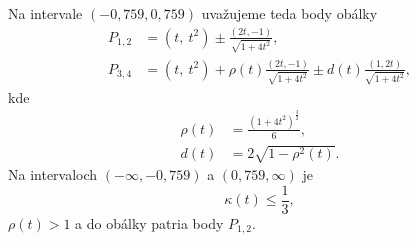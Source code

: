 \begin{example}[Parabola]
$$$$
Na intervale $(-0,759,0,759)$ uvažujeme teda body obálky
\begin{align*}
P_{1,2} &= \left(t,\ t^{2}\right)\pm \frac{\left(2t,-1\right)}{\sqrt{1+4t^{2}}}, \\
P_{3,4} &= \left(t,\ t^{2}\right)+ \rho(t)\frac{\left(2t,-1\right)}{\sqrt{1+4t^{2}}} \pm d(t) \frac{\left(1,2t\right)}{\sqrt{1+4t^{2}}},
\end{align*}
kde 
\begin{align*}
\rho(t) &= \frac{\left(1+4t^{2}\right)^{\frac{3}{2}}}{6}, \\
d(t) &= 2 \sqrt{1 -\rho^{2}(t)}.
\end{align*}
Na intervaloch $(-\infty, -0,759) $ a $(0,759, \infty)$ je 
$$
\kappa(t) \leq \frac{1}{3},
$$
$\rho(t) > 1$ a do obálky patria body $P_{1,2}.$ 
\end{example}

